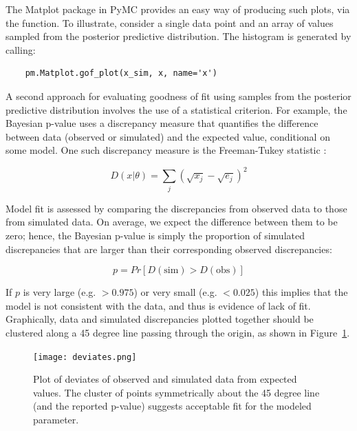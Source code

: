 The Matplot package in PyMC provides an easy way of producing such plots, via the  function. To illustrate, consider a single data point  and an array of values  sampled from the posterior predictive distribution. The histogram is generated by calling:

\begin{verbatim}
	pm.Matplot.gof_plot(x_sim, x, name='x')
\end{verbatim}

A second approach for evaluating goodness of fit using samples from the posterior predictive distribution involves the use of a statistical criterion. For example, the Bayesian p-value \citep{Gelman:1996gp} uses a discrepancy measure that quantifies the difference between data (observed or simulated) and the expected value, conditional on some model. One such discrepancy measure is the Freeman-Tukey statistic \citep{Brooks:2000il}:

\begin{equation}
	D(x|\theta) = \sum_j (\sqrt{x_j}-\sqrt{e_j})^2
\end{equation}

Model fit is assessed by comparing the discrepancies from observed data to those from simulated data. On average, we expect the difference between them to be zero; hence, the Bayesian p-value is simply the proportion of simulated discrepancies that are larger than their corresponding observed discrepancies:

\begin{equation}
	p = Pr[ D(\text{sim}) > D(\text{obs}) ]
\end{equation}

If $p$ is very large (e.g. $>0.975$) or very small (e.g. $<0.025$) this implies that the model is not consistent with the data, and thus is evidence of lack of fit. Graphically, data and simulated discrepancies plotted together should be clustered along a 45 degree line passing through the origin, as shown in Figure~\ref{fig:deviate}.

\begin{figure}[h]
        \begin{center}
        \texttt{[image: deviates.png]}
    \end{center}
    \caption{Plot of deviates of observed and simulated data from expected values. The cluster of points symmetrically about the 45 degree line (and the reported p-value) suggests acceptable fit for the modeled parameter.}
    \label{fig:deviate}
\end{figure}

